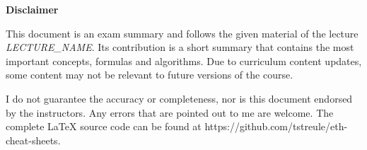 
\providecommand\thetitle{LECTURE\_NAME}

\begingroup
\begin{minipage}{.35\textwidth}

    \setmainfont{Noto Serif}
    \color{black}
    \justifying

    {\Large\bfseries Disclaimer}

    This document is an exam summary and follows the given material of the lecture {\itshape \thetitle}.
    Its contribution is a short summary that contains the most important concepts, formulas and algorithms.
    Due to curriculum content updates, some content may not be relevant to future versions of the course.

    I do not guarantee the accuracy or completeness, nor is this document endorsed by the instructors.
    Any errors that are pointed out to me are welcome.
    The complete {\LaTeX} source code can be found at {\ttfamily https://github.com/tstreule/eth-cheat-sheets}.

\end{minipage}
\endgroup

\pagebreak
